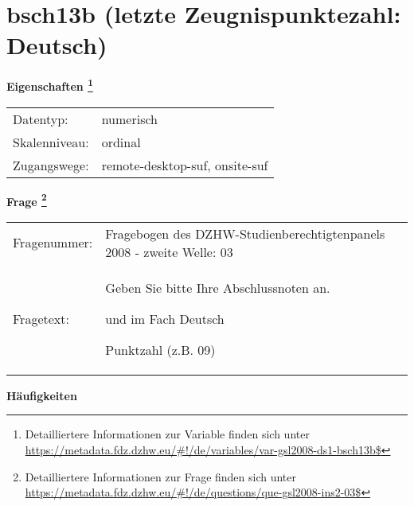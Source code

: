 
    \setcounter{footnote}{0}

    \vspace*{-1.8cm}
	\section{bsch13b (letzte Zeugnispunktezahl: Deutsch)}
	\label{section:bsch13b}



    \vspace*{0.5cm}
    \noindent\textbf{Eigenschaften
	\footnote{Detailliertere Informationen zur Variable finden sich unter
		\url{https://metadata.fdz.dzhw.eu/\#!/de/variables/var-gsl2008-ds1-bsch13b$}}}\\
	\begin{tabularx}{\hsize}{@{}lX}
	Datentyp: & numerisch \\
	Skalenniveau: & ordinal \\
	Zugangswege: &
	  remote-desktop-suf, 
	  onsite-suf
 \\
    \end{tabularx}



				\vspace*{0.5cm}
                \noindent\textbf{Frage
	                \footnote{Detailliertere Informationen zur Frage finden sich unter
		              \url{https://metadata.fdz.dzhw.eu/\#!/de/questions/que-gsl2008-ins2-03$}}}\\
				\begin{tabularx}{\hsize}{@{}lX}
					Fragenummer: &
					  Fragebogen des DZHW-Studienberechtigtenpanels 2008 - zweite Welle:
					  03
 \\
					Fragetext: & Geben Sie bitte Ihre Abschlussnoten an.\par  und im Fach Deutsch\par  Punktzahl (z.B. 09) \\
				\end{tabularx}





        		\vspace*{0.5cm}
                \noindent\textbf{Häufigkeiten}


